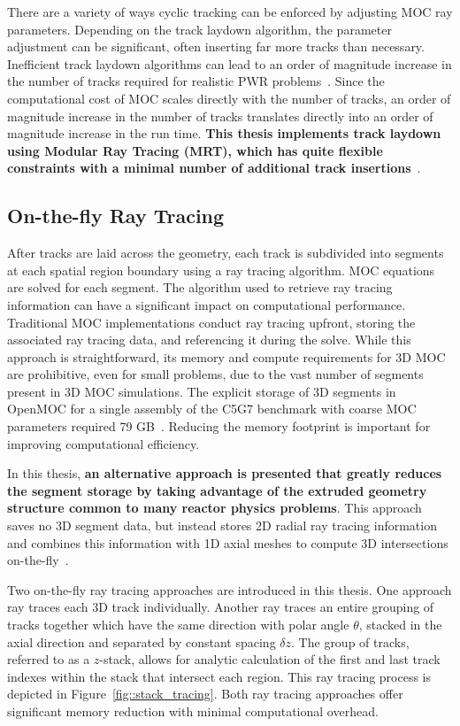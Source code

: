 \documentclass[12pt,twoside]{mitthesis-exec}
\begin{document}
There are a variety of ways cyclic tracking can be enforced by adjusting MOC ray parameters. Depending on the track laydown algorithm, the parameter adjustment can be significant, often inserting far more tracks than necessary. Inefficient track laydown algorithms can lead to an order of magnitude increase in the number of tracks required for realistic PWR problems~\cite{shaner-laydown}. Since the computational cost of MOC scales directly with the number of tracks, an order of magnitude increase in the number of tracks translates directly into an order of magnitude increase in the run time. \textbf{This thesis implements track laydown using Modular Ray Tracing (MRT), which has quite flexible constraints with a minimal number of additional track insertions}~\cite{liu_mrt}.


\subsection*{On-the-fly Ray Tracing}

After tracks are laid across the geometry, each track is subdivided into segments at each spatial region boundary using a ray tracing algorithm. MOC equations are solved for each segment. The algorithm used to retrieve ray tracing information can have a significant impact on computational performance. Traditional MOC implementations conduct ray tracing upfront, storing the associated ray tracing data, and referencing it during the solve. While this approach is straightforward, its memory and compute requirements for 3D MOC are prohibitive, even for small problems, due to the vast number of segments present in 3D MOC simulations. The explicit storage of 3D segments in OpenMOC for a single assembly of the C5G7 benchmark with coarse MOC parameters required 79 GB~\cite{physor2016otf}. Reducing the memory footprint is important for improving computational efficiency.

In this thesis, \textbf{an alternative approach is presented that greatly reduces the segment storage by taking advantage of the extruded geometry structure common to many reactor physics problems}. This approach saves no 3D segment data, but instead stores 2D radial ray tracing information and combines this information with 1D axial meshes to compute 3D intersections on-the-fly~\cite{physor2016otf}.

Two on-the-fly ray tracing approaches are introduced in this thesis. One approach ray traces each 3D track individually. Another ray traces an entire grouping of tracks together which have the same direction with polar angle $\theta$, stacked in the axial direction and separated by constant spacing $\delta z$. The group of tracks, referred to as a $z$-stack, allows for analytic calculation of the first and last track indexes within the stack that intersect each region. This ray tracing process is depicted in Figure~\ref{fig::stack_tracing}. Both ray tracing approaches offer significant memory reduction with minimal computational overhead.
\end{document}
